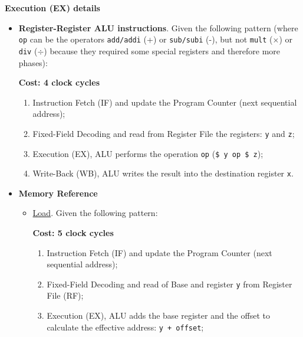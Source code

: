 \documentclass[a4paper]{article}
\begin{document}
    \begin{flushleft}
        \textcolor{Red3}{\textbf{Execution (EX) details}}\label{Execution (EX) details}
    \end{flushleft}
    \begin{itemize}
        \item \textbf{Register-Register ALU instructions}. Given the following pattern (where \texttt{op} can be the operators \texttt{add/addi} (+) or \texttt{sub/subi} (-), but not \texttt{mult} ($\times$) or \texttt{div} ($\div$) because they required some special registers and therefore more phases):
        
        \textbf{Cost: 4 clock cycles}
        \begin{enumerate}
            \item Instruction Fetch (IF) and update the Program Counter (next sequential address);

            \item Fixed-Field Decoding and read from Register File the registers: \texttt{y} and \texttt{z};
            
            \item Execution (EX), ALU performs the operation \texttt{op} (\texttt{\$ y op \$ z});

            \item Write-Back (WB), ALU writes the result into the destination register \texttt{x}.
        \end{enumerate}

        \item \textbf{Memory Reference}
        \begin{itemize}
            \item \underline{Load}. Given the following pattern:
            
            \textbf{Cost: 5 clock cycles}
            \begin{enumerate}
                \item Instruction Fetch (IF) and update the Program Counter (next sequential address);

                \item Fixed-Field Decoding and read of Base and register \texttt{y} from Register File (RF);

                \item Execution (EX), ALU adds the base register and the offset to calculate the effective address: \texttt{y + offset};


\end{enumerate}
\end{itemize}
\end{itemize}
\end{document}
